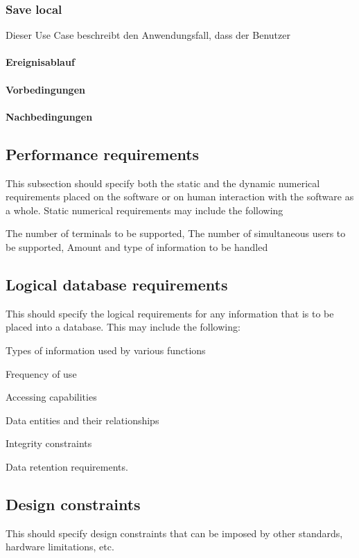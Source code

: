 		\subsubsection{Save local}
			Dieser Use Case beschreibt den Anwendungsfall, dass der Benutzer 
			
			\paragraph{Ereignisablauf}
	
			\paragraph{Vorbedingungen}
			
			\paragraph{Nachbedingungen}
	
	\subsection{Performance requirements}
		This subsection should specify both the static and the dynamic numerical requirements placed on the software or on human interaction with the software as a whole. Static numerical requirements may include the following
		
		The number of terminals to be supported, The number of simultaneous users to be supported, Amount and type of information to be handled
		
	\subsection{Logical database requirements}
		This should specify the logical requirements for any information that is to be placed into a database. This may include the following:
		
		Types of information used by various functions
		
		Frequency of use
		
		Accessing capabilities
		
		Data entities and their relationships
		
		Integrity constraints
		
		Data retention requirements.
	
	\subsection{Design constraints}
		This should specify design constraints that can be imposed by other standards, hardware limitations, etc.
		
